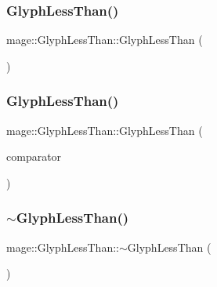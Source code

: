 \subsubsection{\texorpdfstring{Glyph\+Less\+Than()}{GlyphLessThan()}\hspace{0.1cm}{\footnotesize\ttfamily [1/2]}}
{\footnotesize\ttfamily mage\+::\+Glyph\+Less\+Than\+::\+Glyph\+Less\+Than (\begin{DoxyParamCaption}{ }\end{DoxyParamCaption})\hspace{0.3cm}{\ttfamily [default]}}

\hypertarget{structmage_1_1_glyph_less_than_a27fc34d9db41ebba7a7b40864837e7e7}{}\label{structmage_1_1_glyph_less_than_a27fc34d9db41ebba7a7b40864837e7e7} 
\subsubsection{\texorpdfstring{Glyph\+Less\+Than()}{GlyphLessThan()}\hspace{0.1cm}{\footnotesize\ttfamily [2/2]}}
{\footnotesize\ttfamily mage\+::\+Glyph\+Less\+Than\+::\+Glyph\+Less\+Than (\begin{DoxyParamCaption}\item[{const \hyperlink{structmage_1_1_glyph_less_than}{Glyph\+Less\+Than} \&}]{comparator }\end{DoxyParamCaption})\hspace{0.3cm}{\ttfamily [default]}}

\hypertarget{structmage_1_1_glyph_less_than_ace50804a419a31b0413566b5aba2eeac}{}\label{structmage_1_1_glyph_less_than_ace50804a419a31b0413566b5aba2eeac} 
\subsubsection{\texorpdfstring{$\sim$\+Glyph\+Less\+Than()}{~GlyphLessThan()}}
{\footnotesize\ttfamily mage\+::\+Glyph\+Less\+Than\+::$\sim$\+Glyph\+Less\+Than (\begin{DoxyParamCaption}{ }\end{DoxyParamCaption})\hspace{0.3cm}{\ttfamily [default]}}



